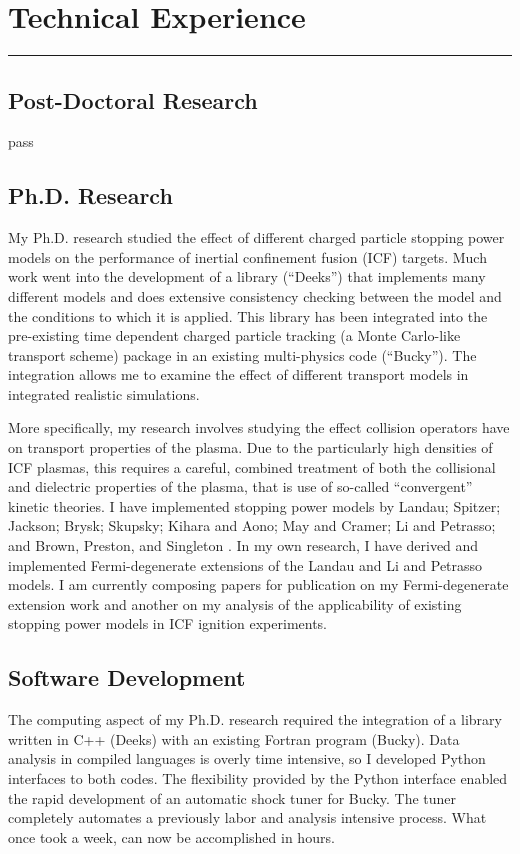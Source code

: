 \documentclass[letterpaper,11pt]{article}
\begin{document}
\section*{Technical Experience}
\hrule
\vspace{0.05in}

\subsection*{Post-Doctoral Research}
pass

\subsection*{Ph.D. Research}
My Ph.D. research studied the effect of different charged particle stopping
power models on the performance of inertial confinement fusion (ICF) targets.
Much work went into the development of a library (``Deeks'') that implements
many different models and does extensive consistency checking between the model
and the conditions to which it is applied.  This library has been integrated
into the pre-existing time dependent charged particle tracking (a Monte
Carlo-like transport scheme) package in an existing multi-physics code
(``Bucky'').  The integration allows me to examine the effect of different
transport models in integrated realistic simulations.

\vspace{0.1in}

More specifically, my research involves studying the effect collision operators have on transport properties of the plasma.  Due to the particularly high densities of ICF plasmas, this requires a careful, combined treatment of both the collisional and dielectric properties of the plasma, that is use of so-called ``convergent'' kinetic theories.  I have implemented stopping power models by 
Landau; 
Spitzer; 
Jackson; 
Brysk; 
Skupsky; 
Kihara and Aono; 
May and Cramer; 
Li and Petrasso; 
and 
Brown, Preston, and Singleton%
.
In my own research, I have derived and implemented Fermi-degenerate extensions of the Landau and Li and Petrasso models.  I am currently composing papers for publication on my Fermi-degenerate extension work and another on my analysis of the applicability of existing stopping power models in ICF ignition experiments.  


\subsection*{Software Development}
The computing aspect of my Ph.D. research required the integration of a library
written in C++ (Deeks) with an existing Fortran program (Bucky).  Data analysis
in compiled languages is overly time intensive, so I developed Python
interfaces to both codes.  The flexibility provided by the Python interface
enabled the rapid development of an automatic shock tuner for Bucky.  The tuner
completely automates a previously labor and analysis intensive process.  What
once took a week, can now be accomplished in hours.
\end{document}
